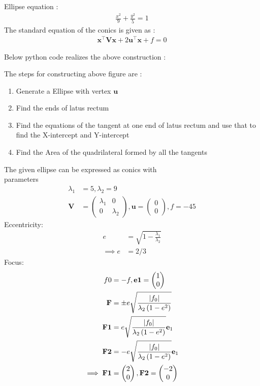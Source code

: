 \documentclass[10pt, a4paper]{article}
\providecommand{\brak}[1]{\ensuremath{\left(#1\right)}}
\newcommand{\myvec}[1]{\ensuremath{\begin{pmatrix}#1\end{pmatrix}}}
\let\vec\mathbf
\begin{document}
Ellipse equation : \begin{align}
\frac{x^2}{9}+\frac{y^2}{5}=1
  \end{align}
The standard equation of the conics is given as :
\begin{align}
\vec{x}^{\top}\vec{V}\vec{x}+2\vec{u}^{\top}\vec{x}+f=0
\end{align}
\begin{center}
Below python code realizes the above construction :
\end{center}
 The steps for constructing above figure are :
\begin{enumerate}
 \item Generate a Ellipse with vertex $\vec{u}$
 \item Find the ends of latus rectum  
 \item Find the equations of the tangent at one end of latus rectum and use that to find the X-intercept and Y-intercept
  \item Find the Area of the quadrilateral formed by all the tangents
\end{enumerate}
The given ellipse can be expressed as conics with \\parameters
\begin{align}
	\lambda_1&=5,\lambda_2=9 \\ \vec{V} &= \myvec{	\lambda_1& 0 \\
			          0 & \lambda_2}  
		    , \vec{u} = \myvec{0 \\0}, f = -45
	\end{align}
	Eccentricity:
	\begin{align}
	 e&=\sqrt{1-\frac{\lambda_1}{\lambda_2}}\\
	 \implies e&=2/3
	 \end{align}
	 Focus:
	 \begin{align}
	 f0&=-f,\vec{e1} = \myvec{1 \\0}\\
	 \vec{F}&= \pm e\sqrt{\frac{\abs{f_0}}{\lambda_2\brak{1-e^2}}}\\
	 	 \vec{F1}&=  e\sqrt{\frac{\abs{f_0}}{\lambda_2\brak{1-e^2}}}\vec{e}_1\\
	 	 \vec{F2}&= - e\sqrt{\frac{\abs{f_0}}{\lambda_2\brak{1-e^2}}}\vec{e}_1\\
	 \implies \vec{F1}&=\myvec{2\\0},\vec{F2}=\myvec{-2\\0}
	 \end{align}
\end{document}
